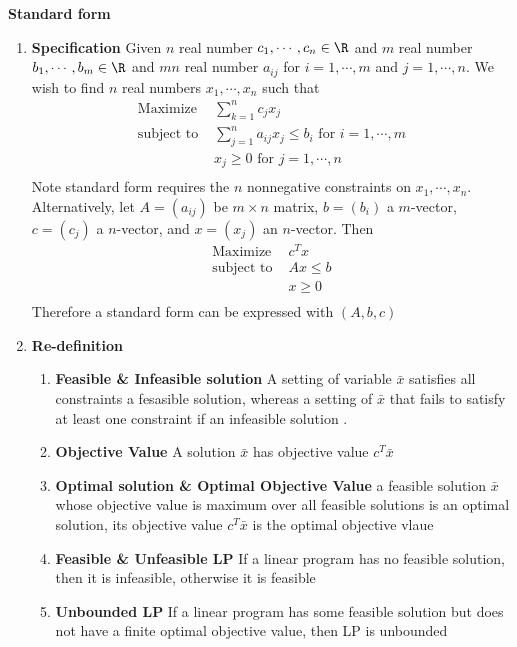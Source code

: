 \documentclass[11pt]{article}
\begin{document}
\begin{defn*}
    \textbf{Standard form}
    \begin{enumerate}
        \item \textbf{Specification} Given $n$ real number $c_1,\cdots, c_n \in \R$ and $m$ real number $b_1,\cdots, b_m\in\R$ and $mn$ real number $a_{ij}$ for $i=1,\cdots,m$ and $j=1,\cdots, n$. We wish to find $n$ real numbers $x_1,\cdots, x_n$ such that 
        \begin{align*}
            \text{Maximize  } &\sum_{k=1}^n c_j x_j \\
            \text{subject to  } &\sum_{j=1}^n a_{ij} x_j \leq b_i \text{ for } i= 1,\cdots, m \\
            & x_j \geq 0 \text{ for } j = 1,\cdots, n\\
        \end{align*}
        Note standard form requires the $n$ nonnegative constraints on $x_1,\cdots,x_n$. Alternatively, let $A = (a_{ij})$ be $m\times n$ matrix, $b = (b_i)$ a $m$-vector, $c = (c_j)$ a $n$-vector, and $x = (x_j)$ an $n$-vector. Then 
        \begin{align*}
            \text{Maximize  } & c^Tx \\
            \text{subject to  } & Ax \leq b \\
            & x\geq 0\\
        \end{align*}
        Therefore a standard form can be expressed with $(A,b,c)$
        \item \textbf{Re-definition}
        \begin{enumerate}
            \item \textbf{Feasible \& Infeasible solution} A setting of variable $\bar{x}$ satisfies all constraints a fesasible solution, whereas a setting of $\bar{x}$ that fails to satisfy at least one constraint if an infeasible solution . 
            \item \textbf{Objective Value} A solution $\bar{x}$ has objective value $c^T \bar{x}$ 
            \item \textbf{Optimal solution \& Optimal Objective Value} a feasible solution $\bar{x}$ whose objective value is maximum over all feasible solutions is an optimal solution, its objective value $c^T \bar{x}$ is the optimal objective vlaue 
            \item \textbf{Feasible \& Unfeasible LP} If a linear program has no feasible solution, then it is infeasible, otherwise it is feasible 
            \item \textbf{Unbounded LP} If a linear program has some feasible solution but does not have a finite optimal objective value, then LP is unbounded 

\end{enumerate}
\end{enumerate}
\end{defn*}
\end{document}
